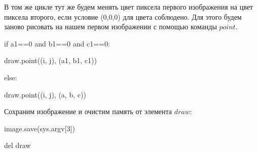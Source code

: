 \documentclass{article}
\newcommand\tab[1][1cm]{\hspace*{#1}}
\begin{document}
В том же цикле тут же будем менять цвет пиксела первого изображения на цвет пиксела второго, если условие (0,0,0) для цвета соблюдено. Для этого будем заново рисовать на нашем первом изображении с помощью команды $point$.

\newpage

{
if a1==0 and b1==0 and c1==0:

\tab[0.5cm] draw.point((i, j), (a1, b1, c1))
	    
else:
		     
\tab[0.5cm] draw.point((i, j), (a, b, c))}

Сохраним изображение и очистим память от элемента $draw$:	
	
{
image.save(sys.argv[3])

del draw
 }
  
\end{document}
